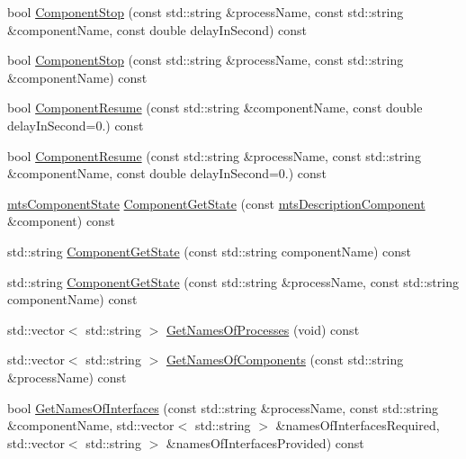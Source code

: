 \begin{DoxyCompactItemize}
\item 
bool \hyperlink{classmts_manager_component_services_a85c5932959c5749a94f2c5ddcd827955}{Component\-Stop} (const std\-::string \&process\-Name, const std\-::string \&component\-Name, const double delay\-In\-Second) const 
\item 
bool \hyperlink{classmts_manager_component_services_ad812caeaf90184905e3018dd9a179656}{Component\-Stop} (const std\-::string \&process\-Name, const std\-::string \&component\-Name) const 
\item 
bool \hyperlink{classmts_manager_component_services_a1a7c9681b7c4cca3eac66609e25ecf02}{Component\-Resume} (const std\-::string \&component\-Name, const double delay\-In\-Second=0.) const 
\item 
bool \hyperlink{classmts_manager_component_services_a06266b2614a2607b2e1f645c0f26de17}{Component\-Resume} (const std\-::string \&process\-Name, const std\-::string \&component\-Name, const double delay\-In\-Second=0.) const 
\item 
\hyperlink{classmts_component_state}{mts\-Component\-State} \hyperlink{classmts_manager_component_services_a45db338b5d8dca05cbfaa23494f4719d}{Component\-Get\-State} (const \hyperlink{classmts_description_component}{mts\-Description\-Component} \&component) const 
\item 
std\-::string \hyperlink{classmts_manager_component_services_ad46de601398935707428ad4f4d5438b8}{Component\-Get\-State} (const std\-::string component\-Name) const 
\item 
std\-::string \hyperlink{classmts_manager_component_services_abfd5fbf1f42ddd2278acdedbf77303f9}{Component\-Get\-State} (const std\-::string \&process\-Name, const std\-::string component\-Name) const 
\item 
std\-::vector$<$ std\-::string $>$ \hyperlink{classmts_manager_component_services_af961f84fde69fcaf76f1d070e9c5d712}{Get\-Names\-Of\-Processes} (void) const 
\item 
std\-::vector$<$ std\-::string $>$ \hyperlink{classmts_manager_component_services_af3aee169d9fc69f0807784371bbf488f}{Get\-Names\-Of\-Components} (const std\-::string \&process\-Name) const 
\item 
bool \hyperlink{classmts_manager_component_services_a51b7abf298cced848c5f967e6dc25f81}{Get\-Names\-Of\-Interfaces} (const std\-::string \&process\-Name, const std\-::string \&component\-Name, std\-::vector$<$ std\-::string $>$ \&names\-Of\-Interfaces\-Required, std\-::vector$<$ std\-::string $>$ \&names\-Of\-Interfaces\-Provided) const 

\end{DoxyCompactItemize}
